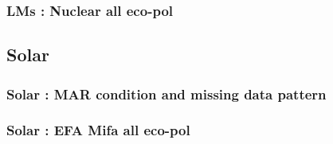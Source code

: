 \documentclass[
]{article}
\begin{document}
\hypertarget{lms-nuclear-all-eco-pol}{%
\subsubsection{LMs : Nuclear all
eco-pol}\label{lms-nuclear-all-eco-pol}}

\hypertarget{solar}{%
\subsection{Solar}\label{solar}}

\hypertarget{solar-mar-condition-and-missing-data-pattern}{%
\subsubsection{Solar : MAR condition and missing data
pattern}\label{solar-mar-condition-and-missing-data-pattern}}

\hypertarget{solar-efa-mifa-all-eco-pol}{%
\subsubsection{Solar : EFA Mifa all
eco-pol}\label{solar-efa-mifa-all-eco-pol}}
\end{document}
